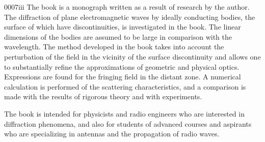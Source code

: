 \begin{scanpage}{0007}{iii}
\vspace*{1cm}
The book is a monograph written as a result of research by the author. The diffraction of plane electromagnetic waves by ideally conducting bodies, the surface of which have discontinuities, is investigated in the book. The linear dimensions of the bodies are assumed to be large in comparison with the wavelength. The method developed in the book takes into account the perturbation of the field in the vicinity of the surface discontinuity and allows one to substantially refine the approximations of geometric and physical optics. Expressions are found for the fringing field in the distant zone. A numerical calculation is performed of the scattering characteristics, and a comparison is made with the results of rigorous theory and with experiments.

The book is intended for physicists and radio engineers who are interested in diffraction phenomena, and also for students of advanced courses and aspirants who are specializing in antennas and the propagation of radio waves.
\end{scanpage}
